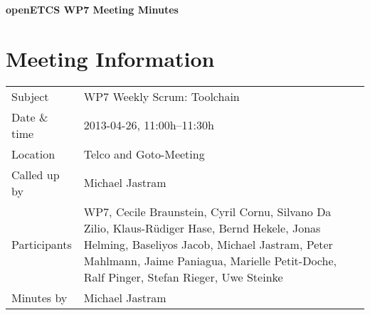 \documentclass[a4paper, 11pt]{article}
\begin{document}
{\begin{center}\huge\bf openETCS WP7 Meeting Minutes\end{center}}
\section{Meeting Information}

\renewcommand{\arraystretch}{1.5}
\begin{supertabular}{m{.2\textwidth}m{.8\textwidth}}
Subject & WP7 Weekly Scrum: Toolchain\\
Date \& time & 2013-04-26, 11:00h--11:30h\\
Location & Telco and Goto-Meeting\\
Called up by & Michael Jastram\\
Participants & WP7,
Cecile Braunstein,
Cyril Cornu, 
Silvano Da Zilio,
Klaus-R\"udiger Hase,
Bernd Hekele,
Jonas Helming,
Baseliyos Jacob,
Michael Jastram, 
Peter Mahlmann, 
Jaime Paniagua,
Marielle Petit-Doche, 
Ralf Pinger,
Stefan Rieger,
Uwe Steinke\\

Minutes by & Michael Jastram\\

\end{supertabular}
\renewcommand{\arraystretch}{1.0}

\end{document}
